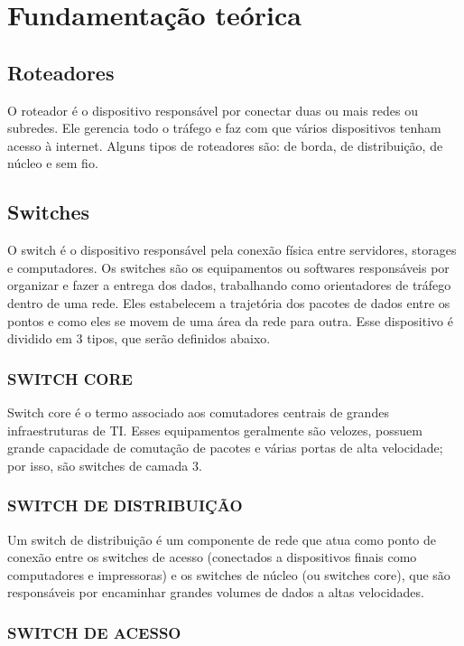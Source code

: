 \section{Fundamentação teórica}

\subsection{Roteadores}
O roteador é o dispositivo responsável por conectar duas ou mais redes ou subredes\cite{kurose}. Ele gerencia todo o tráfego e faz com que vários dispositivos tenham acesso à internet. Alguns tipos de roteadores são: de borda, de distribuição, de núcleo e sem fio.

\subsection{Switches}
O switch é o dispositivo responsável pela conexão física entre servidores, storages e computadores. Os switches são os equipamentos ou softwares responsáveis por organizar e fazer a entrega dos dados, trabalhando como orientadores de tráfego dentro de uma rede. Eles estabelecem a trajetória dos pacotes de dados entre os pontos e como eles se movem de uma área da rede para outra. Esse dispositivo é dividido em 3 tipos, que serão definidos abaixo.

\subsubsection{SWITCH CORE}
Switch core é o termo associado aos comutadores centrais de grandes infraestruturas de TI. Esses equipamentos geralmente são velozes, possuem grande capacidade de comutação de pacotes e várias portas de alta velocidade; por isso, são switches de camada 3.

\subsubsection{SWITCH DE DISTRIBUIÇÃO}
Um switch de distribuição é um componente de rede que atua como ponto de conexão entre os switches de acesso (conectados a dispositivos finais como computadores e impressoras) e os switches de núcleo (ou switches core), que são responsáveis por encaminhar grandes volumes de dados a altas velocidades.

\subsubsection{SWITCH DE ACESSO}

